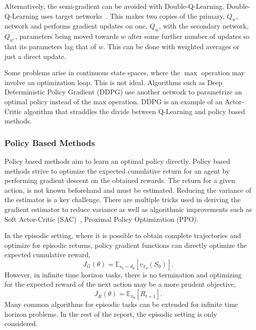 Alternatively, the semi-gradient can be avoided with Double-Q-Learning. Double-Q-Learning uses target networks~\cite{van2016deep}. This makes two copies of the primary, $Q_w$, network and performs gradient updates on one, $Q_w$, with the secondary network, $Q_{w'}$, parameters being moved towards $w$ after some further number of updates so that its parameters lag that of $w$. This can be done with weighted averages or just a direct update.

Some problems arise in continuous state spaces, where the $\max$ operation may involve an optimization loop. This is not ideal. Algorithms such as Deep Deterministic Policy Gradient (DDPG)\cite{lillicrap2015continuous} use another network to parametrize an optimal policy instead of the max operation. DDPG is an example of an Actor-Critic algorithm that straddles the divide between Q-Learning and policy based methods.


\subsubsection{Policy Based Methods}
Policy based methods aim to learn an optimal policy directly. Policy based methods strive to optimize the expected cumulative return for an agent by performing gradient descent on the obtained rewards. The return for a given action, is not known beforehand and must be estimated. Reducing the variance of the estimator is a key challenge. There are multiple tricks used in deriving the gradient estimator to reduce variance as well as algorithmic improvements such as Soft Actor-Critic (SAC)~\cite{haarnoja2018soft}, Proximal Policy Optimization (PPO)\cite{schulman2017proximal}.

In the episodic setting, where it is possible to obtain complete trajectories and optimize for episodic returns, policy gradient functions can directly optimize the expected cumulative reward,
\begin{equation}
	J_G(\theta) = \mathbb{E}_{s_0 \sim d_0}\left[v_{\pi_{\theta}}(S_0)\right].
\end{equation}
However, in infinite time horizon tasks, there is no termination and optimizing for the expected reward of the next action may be a more prudent objective,
\begin{equation}
	J_R(\theta)
	= \mathbb{E}_{\pi_{\theta}}\left[R_{t+1}\right].
\end{equation}
Many common algorithms for episodic tasks can be extended for infinite time horizon problems. In the rest of the report, the episodic setting is only considered.

